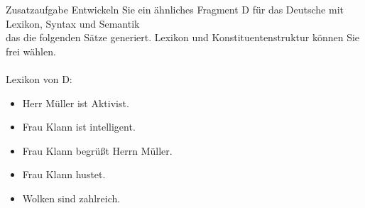 \begin{frame}
  {Zusatzaufgabe}
  \onslide<+->
  \onslide<+->
  \small Entwickeln Sie ein ähnliches Fragment D für das Deutsche mit Lexikon, Syntax und Semantik\\
  das die folgenden Sätze generiert. Lexikon und Konstituentenstruktur können Sie frei wählen.\\
  \\
  \onslide<+->
  \Halbzeile
  Lexikon von D:
  \begin{itemize}[<+->]
    \item Herr Müller ist Aktivist.
    \item Frau Klann ist intelligent.
    \item Frau Klann begrüßt Herrn Müller.
    \item Frau Klann hustet.
    \item Wolken sind zahlreich.\\
  \end{itemize}
\end{frame}
